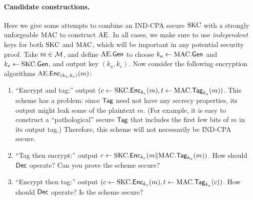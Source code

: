 \documentclass[11pt]{article}
\begin{document}
\paragraph{Candidate constructions.}

Here we give some attempts to combine an IND-CPA secure $\text{SKC}$ with a
strongly unforgeable $\text{MAC}$ to construct $\text{AE}$.  In all cases,
we make sure to use \emph{independent} keys for both $\text{SKC}$ and
$\text{MAC}$, which will be important in any potential security proof.  Take
$m \in \mathcal{M}$, and define $\text{AE}.\mathsf{Gen}$ to choose $k_a
\gets \text{MAC}.\mathsf{Gen}$ and $k_e \gets \text{SKC}.\mathsf{Gen}$, and output
key $(k_{a}, k_{e})$.  Now consider the following encryption
algorithms $\text{AE}.\mathsf{Enc}_{(k_{a},k_{e})}(m)$:

\begin{enumerate}
\item ``Encrypt and tag:'' output $(c \gets \text{SKC}.\mathsf{Enc}_{k_e}(m), t
  \gets \text{MAC}.\mathsf{Tag}_{k_a}(m))$.  This scheme has a problem: since
  $\mathsf{Tag}$ need not have any secrecy properties, its output might
  leak some of the plaintext $m$.  (For example, it is easy to
  construct a ``pathological'' secure $\mathsf{Tag}$ that includes the
  first few bits of $m$ in its output tag.)  Therefore, this scheme
  will not necessarily be IND-CPA secure.
  
\item ``Tag then encrypt:'' output $c \gets \text{SKC}.\mathsf{Enc}_{k_e}(m
  \| \text{MAC}.\mathsf{Tag}_{k_a}(m))$.  How should $\mathsf{Dec}$ operate?  Can
  you prove the scheme secure?
  
\item ``Encrypt then tag:'' output $(c \gets \text{SKC}.\mathsf{Enc}_{k_e}(m), t
  \gets \text{MAC}.\mathsf{Tag}_{k_a}(c))$.  How should $\mathsf{Dec}$ operate?  Is
  the scheme secure?
\end{enumerate}
\end{document}
